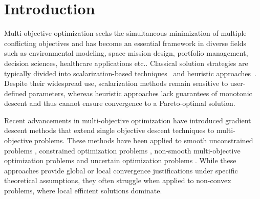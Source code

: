 \documentclass[amsa]{ipart}
\theoremstyle{plain}
\numberwithin{equation}{section}
\begin{document}
\section{Introduction}\label{sec1}
Multi-objective optimization seeks the simultaneous minimization of multiple conflicting objectives and has become an essential framework in diverse fields such as environmental modeling, space mission design, portfolio management, decision sciences, healthcare applications etc.. Classical solution strategies are typically divided into scalarization-based techniques~\cite{ghane2015new,kasimbeyli2013conic,kasimbeyli2019comparison,Miettinen2012-rv} and heuristic approaches~\cite{castro2018evaluating,konak2006multi,mostaghim2007multi,laumanns2002combining}. Despite their widespread use, scalarization methods remain sensitive to user-defined parameters, whereas heuristic approaches lack guarantees of monotonic descent and thus cannot ensure convergence to a Pareto-optimal solution.
\par Recent advancements in multi-objective optimization have introduced gradient descent methods that extend single objective descent techniques to multi-objective problems. These methods have been applied to smooth unconstrained problems \cite{ansary2015modified, fliege2009newton, fliege2000steepest}, constrained optimization problems \cite{ansary2020sequential, ansary2021sqcqp, fliege2016sqp}, non-smooth multi-objective optimization problems \cite{ansary2023proximal, ansary2022proximal, bento2014proximal, tanabe2019proximal, tung2025second, upadhyay2025inexact} and uncertain optimization problems \cite{bai2024convergence, ghosh2023newton, kumar2024steepest, kumar2023newton}. While these approaches provide global or local convergence justifications under specific theoretical assumptions, they often struggle when applied to non-convex problems, where local efficient solutions dominate.
\end{document}
